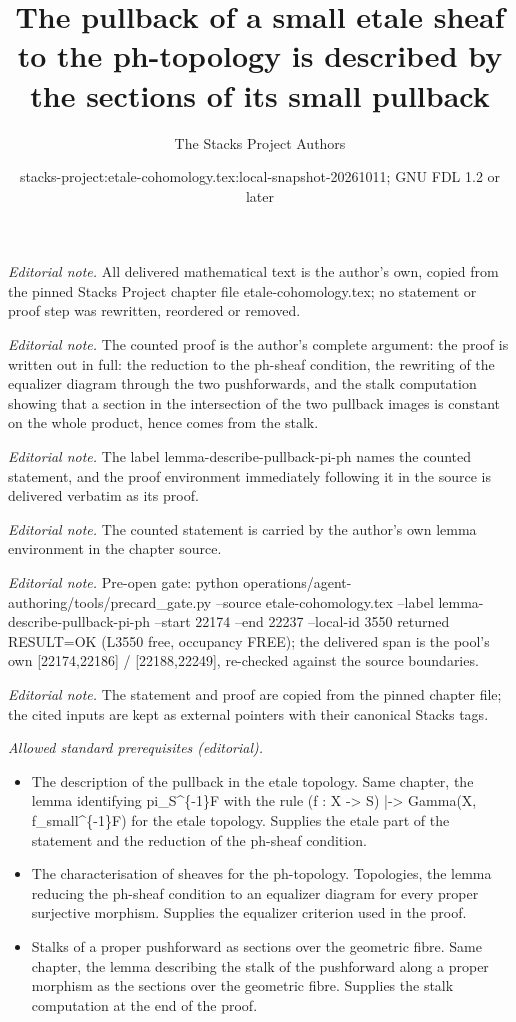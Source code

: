 \documentclass[10pt,a4paper]{amsart}
\title{The pullback of a small etale sheaf to the ph-topology is described by the sections of its small pullback}
\author{The Stacks Project Authors}
\date{stacks-project:etale-cohomology.tex:local-snapshot-20261011; GNU FDL 1.2 or later}
\theoremstyle{plain}
\theoremstyle{definition}
\theoremstyle{remark}
\numberwithin{equation}{subsection}
\begin{document}
\maketitle
\noindent\textit{Editorial note.} All delivered mathematical text is the author's own, copied from the pinned Stacks Project chapter file etale-cohomology.tex; no statement or proof step was rewritten, reordered or removed.\par\medskip
\noindent\textit{Editorial note.} The counted proof is the author's complete argument: the proof is written out in full: the reduction to the ph-sheaf condition, the rewriting of the equalizer diagram through the two pushforwards, and the stalk computation showing that a section in the intersection of the two pullback images is constant on the whole product, hence comes from the stalk.\par\medskip
\noindent\textit{Editorial note.} The label lemma-describe-pullback-pi-ph names the counted statement, and the proof environment immediately following it in the source is delivered verbatim as its proof.\par\medskip
\noindent\textit{Editorial note.} The counted statement is carried by the author's own lemma environment in the chapter source.\par\medskip
\noindent\textit{Editorial note.} Pre-open gate: python operations/agent-authoring/tools/precard\_gate.py --source etale-cohomology.tex --label lemma-describe-pullback-pi-ph --start 22174 --end 22237 --local-id 3550 returned RESULT=OK (L3550 free, occupancy FREE); the delivered span is the pool's own [22174,22186] / [22188,22249], re-checked against the source boundaries.\par\medskip
\noindent\textit{Editorial note.} The statement and proof are copied from the pinned chapter file; the cited inputs are kept as external pointers with their canonical Stacks tags.\par\medskip
\noindent\textit{Allowed standard prerequisites (editorial).}\begin{itemize}
\item The description of the pullback in the etale topology. Same chapter, the lemma identifying pi\_S\textasciicircum{}\{-1\}F with the rule (f : X -> S) |-> Gamma(X, f\_small\textasciicircum{}\{-1\}F) for the etale topology. Supplies the etale part of the statement and the reduction of the ph-sheaf condition.
\item The characterisation of sheaves for the ph-topology. Topologies, the lemma reducing the ph-sheaf condition to an equalizer diagram for every proper surjective morphism. Supplies the equalizer criterion used in the proof.
\item Stalks of a proper pushforward as sections over the geometric fibre. Same chapter, the lemma describing the stalk of the pushforward along a proper morphism as the sections over the geometric fibre. Supplies the stalk computation at the end of the proof.
\end{itemize}\medskip
\end{document}
